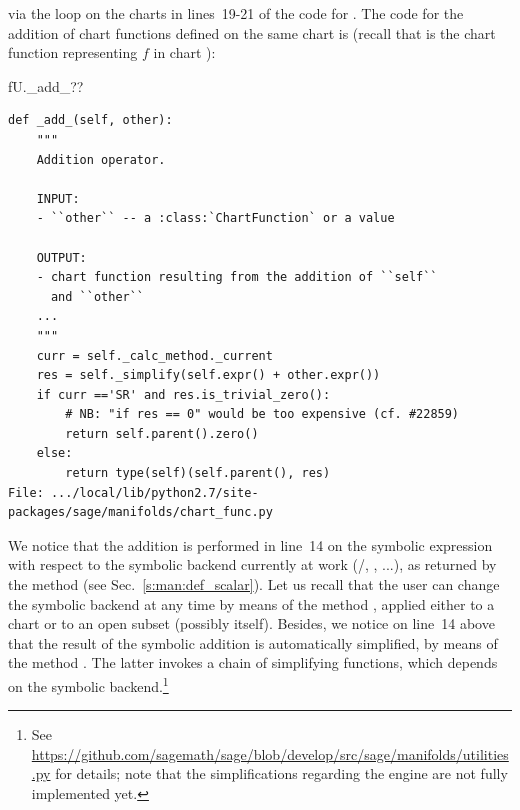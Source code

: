 via the loop on the charts in lines~19-21 of the code for .
The code for the addition of chart functions defined on the same chart
is (recall that  is the chart function representing $f$ in chart ):
\begin{NBin}
fU._add_??
\end{NBin}
\begin{lstlisting}
def _add_(self, other):
    """
    Addition operator.

    INPUT:
    - ``other`` -- a :class:`ChartFunction` or a value

    OUTPUT:
    - chart function resulting from the addition of ``self``
      and ``other``
    ...
    """
    curr = self._calc_method._current
    res = self._simplify(self.expr() + other.expr())
    if curr =='SR' and res.is_trivial_zero():
        # NB: "if res == 0" would be too expensive (cf. #22859)
        return self.parent().zero()
    else:
        return type(self)(self.parent(), res)
File: .../local/lib/python2.7/site-packages/sage/manifolds/chart_func.py
\end{lstlisting}
We notice that the addition is performed in line~14 on the symbolic expression
with respect to the symbolic backend currently at work (\Sage{}/, , ...), as returned by
the method  (see Sec.~\ref{s:man:def_scalar}).
Let us recall that the user can change the symbolic backend at any time
by means of the method , applied either to
a chart or to an open subset (possibly  itself).
Besides, we notice on line~14 above that the result of the symbolic addition
is automatically simplified, by means of the method .
The latter invokes a chain of simplifying functions, which depends on the
symbolic backend.\footnote{See
\url{https://github.com/sagemath/sage/blob/develop/src/sage/manifolds/utilities.py}
for details; note that the simplifications regarding the  engine are not
fully implemented yet.}

